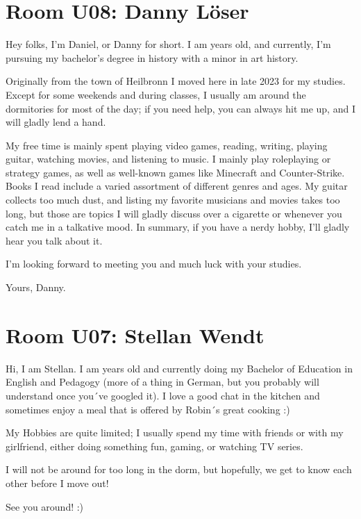 \section{Room U08: Danny Löser} \label{sec:dannyL}
%
\FPsub\result{\theCurrentDate}{\theBirthdate}
\FPdiv{}
\FPtrunc{}

Hey folks, I'm Daniel, or Danny for short. I am \myage{} years old, and currently, I'm pursuing my bachelor's degree in history with a minor in art history.

Originally from the town of Heilbronn I moved here in late 2023 for my studies. Except for some weekends and during classes, I usually am around the dormitories for most of the day; if you need help, you can always hit me up, and I will gladly lend a hand.

My free time is mainly spent playing video games, reading, writing, playing guitar, watching movies, and listening to music. I mainly play roleplaying or strategy games, as well as well-known games like Minecraft and Counter-Strike. Books I read include a varied assortment of different genres and ages. My guitar collects too much dust, and listing my favorite musicians and movies takes too long, but those are topics I will gladly discuss over a cigarette or whenever you catch me in a talkative mood. In summary, if you have a nerdy hobby, I'll gladly hear you talk about it.

I'm looking forward to meeting you and much luck with your studies.

Yours, Danny.

\section{Room U07: Stellan Wendt} \label{sec:stellanW}
%
\FPsub\result{\theCurrentDate}{\theBirthdate}
\FPdiv{}
\FPtrunc{}

Hi, I am Stellan. I am \myage{} years old and currently doing my Bachelor of Education in English and Pedagogy (more of a thing in German, but you probably will understand once you´ve googled it). I love a good chat in the kitchen and sometimes enjoy a meal that is offered by Robin´s great cooking :)

My Hobbies are quite limited; I usually spend my time with friends or with my girlfriend, either doing something fun, gaming, or watching TV series.

I will not be around for too long in the dorm, but hopefully, we get to know each other before I move out!

See you around! :)